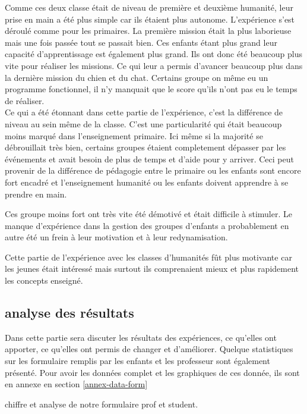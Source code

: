 Comme ces deux classe était de niveau de première et deuxième humanité, leur prise en main a été plus simple car ils étaient plus autonome. L'expérience s'est déroulé comme pour les primaires. La première mission était la plus laborieuse mais une fois passée tout se passait bien. Ces enfants étant plus grand leur capacité d'apprentissage est également plus grand. Ils ont donc été beaucoup plus vite pour réaliser les missions. Ce qui leur a permis d'avancer beaucoup plus dans la dernière mission du chien et du chat. Certains groupe on même eu un programme fonctionnel, il n'y manquait que le score qu'ils n'ont pas eu le temps de réaliser.\\

Ce qui a été étonnant dans cette partie de l'expérience, c'est la différence de niveau au sein même de la classe. C'est une particularité qui était beaucoup moins marqué dans l'enseignement primaire. Ici même si la majorité se débrouillait très bien, certains groupes étaient completement dépasser par les événements et avait besoin de plus de temps et d'aide pour y arriver. Ceci peut provenir de la différence de pédagogie entre le primaire ou les enfants sont encore fort encadré et l'enseignement humanité ou les enfants doivent apprendre à se prendre en main.

Ces groupe moins fort ont très vite été démotivé et était difficile à stimuler. Le manque d'expérience dans la gestion des groupes d'enfants a probablement en autre été un frein à leur motivation et à leur redynamisation.

Cette partie de l'expérience avec les classes d'humanités fût plus motivante car les jeunes était intéressé mais surtout ils comprenaient mieux et plus rapidement les concepts enseigné.


\subsection{analyse des résultats}
Dans cette partie sera discuter les résultats des expériences, ce qu'elles ont apporter, ce qu'elles ont permis de changer et d'améliorer. Quelque statistiques sur les formulaire remplis par les enfants et les professeur sont également présenté. Pour avoir les données complet et les graphiques de ces donnée, ils sont en annexe en section \ref{annex-data-form}

chiffre et analyse de notre formulaire prof et student.
















